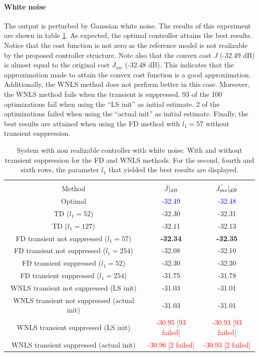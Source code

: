 \paragraph{White noise}
The output is perturbed by Gaussian white noise. The results of this experiment are shown in table \ref{tab:non_realizable_white_transient_with_without_TD_vs_FD_vs_WNLS}. As expected, the optimal controller attains the best results. Notice that the cost function is not zero as the reference model is not realizable by the proposed controller structure. Note also that the convex cost $J$ (-32.49 dB) is almost equal to the original cost $J_{mr}$ (-32.48 dB). This indicates that the approximation made to attain the convex cost function is a good approximation. Additionally, the WNLS method does not perform better in this case. Moreover, the WNLS method fails when the transient is suppressed. 93 of the 100 optimizations fail when using the ``LS init'' as initial estimate. 2 of the optimizations failed when using the ``actual init'' as initial estimate. Finally, the best results are attained when using the FD method with $l_1 =  57$ without transient suppression.

\begin{table}[H]
\centering
\begin{tabular}{|ccc|}
\hline
&&\\[-2.5ex]
Method & $\Bar{J}|_{dB}$ & $\Bar{J_{mr}}|_{dB}$ \\
\hline
Optimal                                     & \textcolor{blue}{-32.49} & \textcolor{blue}{-32.48} \\
TD ($l_1 = 52$)                               & -32.30 & -32.31 \\
TD ($l_1 = 127$)                            & -32.11 & -32.13 \\
FD transient not suppressed ($l_1 = 57$)      & \textbf{-32.34} & \textbf{-32.35} \\
FD transient not suppressed ($l_1 = 254$)   & -32.08 & -32.10 \\
FD transient suppressed ($l_1 = 52$)          & -32.30 & -32.30 \\
FD transient suppressed ($l_1 = 254$)       & -31.75 & -31.78 \\
WNLS transient not suppressed (LS init)     & -31.03 & -31.01 \\
WNLS transient not suppressed (actual init) & -31.03 & -31.01 \\
WNLS transient suppressed (LS init)         & \textcolor{red}{-30.95 [93 failed]}    & \textcolor{red}{-30.93 [93 failed]}    \\
WNLS transient suppressed (actual init)     & \textcolor{red}{-30.96 [2 failed]} & \textcolor{red}{-30.93 [2 failed]} \\

\hline
\end{tabular}
\caption{System with non realizable controller with white noise. With and without transient suppression for the FD and WNLS methods. For the second, fourth and sixth rows, the parameter $l_1$ that yielded the best results are displayed.}
\label{tab:non_realizable_white_transient_with_without_TD_vs_FD_vs_WNLS}
\end{table}

